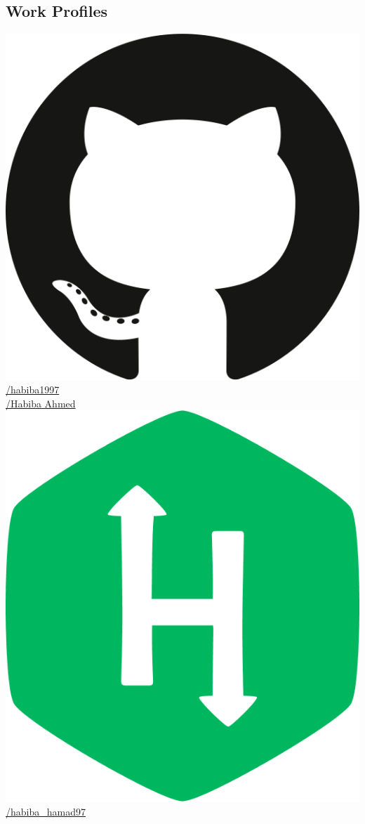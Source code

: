 \documentclass[hidelinks]{article}
\begin{document}
\begin{textblock}{3.3}
\section*{Work Profiles}\vspace{-4pt}
\includegraphics[scale=0.0175]{github.png}\space\space\href{https://github.com/habiba1997}{/habiba1997} \\[4pt]
\href{https://www.linkedin.com/in/habiba-ahmed-563399127}{\faLinkedin\space\space/Habiba Ahmed} \\[4pt]
\includegraphics[scale=0.015]{hackerrank.png}\space\space\href{https://www.hackerrank.com/habiba_hamad97}{/habiba\_hamad97}


\end{textblock}
\end{document}
